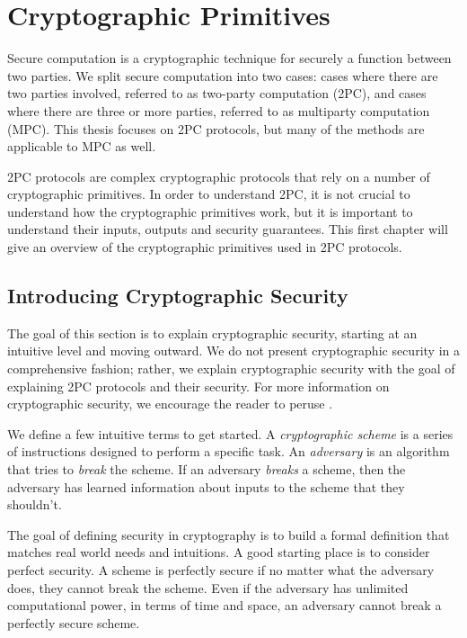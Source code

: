 
\chapter{Cryptographic Primitives}
Secure computation is a cryptographic technique for securely a function between two parties.
We split secure computation into two cases: cases where there are two parties involved, referred to as two-party computation (2PC), and cases where there are three or more parties, referred to as multiparty computation (MPC).
This thesis focuses on 2PC protocols, but many of the methods are applicable to MPC as well.

2PC protocols are complex cryptographic protocols that rely on a number of cryptographic primitives.
In order to understand 2PC, it is not crucial to understand how the cryptographic primitives work, but it is important to understand their inputs, outputs and security guarantees. 
This first chapter will give an overview of the cryptographic primitives used in 2PC protocols.

\section{Introducing Cryptographic Security} 
The goal of this section is to explain cryptographic security, starting at an intuitive level and moving outward. 
We do not present cryptographic security in a comprehensive fashion; rather, we explain cryptographic security with the goal of explaining 2PC protocols and their security.
For more information on cryptographic security, we encourage the reader to peruse \cite{katzlindelltextbook}. 

We define a few intuitive terms to get started.
A \textit{cryptographic scheme} is a series of instructions designed to perform a specific task. 
An \textit{adversary} is an algorithm that tries to \textit{break} the scheme. 
If an adversary \textit{breaks} a scheme, then the adversary has learned information about inputs to the scheme that they shouldn't. 

The goal of defining security in cryptography is to build a formal definition that matches real world needs and intuitions. 
A good starting place is to consider perfect security. 
A scheme is perfectly secure if no matter what the adversary does, they cannot break the scheme.
Even if the adversary has unlimited computational power, in terms of time and space, an adversary cannot break a perfectly secure scheme. 

